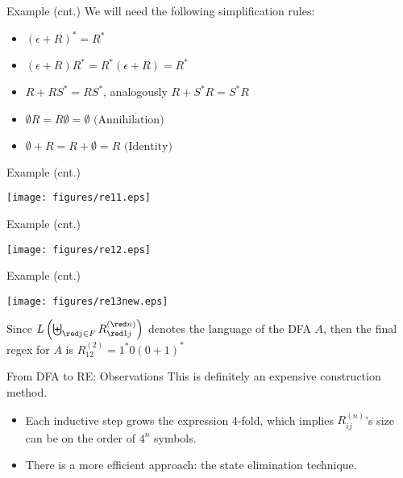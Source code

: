 \documentclass{prosper}%
\newcommand{\e} {{\mbox{$\epsilon$}}}
\begin{document}
\begin{slide}{Example (cnt.)}
We will need the following simplification rules:
\begin{itemize}
\item $(\e+R)^*=R^*$
\item $(\e+R)R^*=R^*(\e+R)=R^*$
\item $R+RS^*=RS^*$, analogously $R+S^*R=S^*R$
\item $\emptyset R=R\emptyset=\emptyset \mbox{ (Annihilation)}$
\item $\emptyset +R=R+\emptyset=R \mbox{ (Identity)}$
\end{itemize}
\end{slide}

\begin{slide}{Example (cnt.)}
\begin{center}
\texttt{[image: figures/re11.eps]}
\end{center}
\end{slide}

\begin{slide}{Example (cnt.)}
\begin{center}
\texttt{[image: figures/re12.eps]}
\end{center}
\end{slide}

\begin{slide}{Example (cnt.)}
\begin{center}
\texttt{[image: figures/re13new.eps]}
\end{center}
Since \(L\left(\biguplus_{\red j\in F}R_{\red 1j}^{({\red n})}\right)
\) denotes the language of the DFA $A$, then the final regex for $A$ is
\(
R^{(2)}_{12}=1^*0(0+1)^*
\)
\end{slide}



\begin{slide}{From DFA to RE: Observations}
This is definitely an expensive construction method.
\begin{itemize}
\item Each inductive step grows the expression 4-fold, which implies $R_{ij}^{(n)}$'s size can be on the order of $4^n$ symbols.
\item There is a more efficient approach: the state elimination technique.
\end{itemize}
\end{slide}
\end{document}
